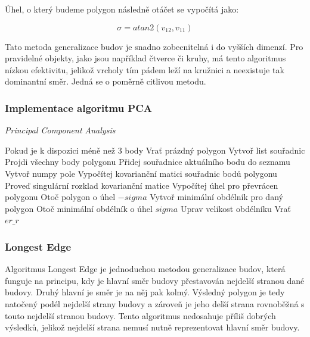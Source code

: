 \documentclass{article}
\begin{document}
\begin{spacing}{1.5}
Úhel, o který budeme polygon následně otáčet se vypočítá jako:

$$\sigma = atan2(v_{12},v_{11}) $$

Tato metoda generalizace budov je snadno zobecnitelná i do vyšších dimenzí. Pro pravidelné objekty, jako jsou například čtverce či kruhy, má tento algoritmus nízkou efektivitu, jelikož vrcholy tím pádem leží na kružnici a neexistuje tak dominantní směr. Jedná se o poměrně citlivou metodu. 

\newpage
\subsubsection*{Implementace algoritmu PCA}
\begin{algorithm}[h]
    \caption {\textit{Principal Component Analysis }}
    \begin{algorithmic}[1]
        \State Pokud je k dispozici méně než 3 body
        \State \indent Vrať prázdný polygon
        \State Vytvoř list souřadnic 
        \State Projdi všechny body polygonu
        \State \indent Přidej souřadnice aktuálního bodu do seznamu
        \State Vytvoř numpy pole
        \State Vypočítej kovarianční matici souřadnic bodů polygonu
        \State Proveď singulární rozklad kovarianční matice
        \State Vypočítej úhel pro převrácen polygonu
        \State Otoč polygon o úhel $-sigma$
        \State Vytvoř minimální obdélník pro daný polygon
        \State  Otoč minimální obdélník o úhel $sigma$
        \State Uprav velikost obdélníku 
        \State Vrať $er\_r$
    \end{algorithmic}
\end{algorithm}

\subsubsection{Longest Edge}
Algoritmus Longest Edge je jednoduchou metodou generalizace budov, která funguje na principu, kdy je hlavní směr budovy přestavován nejdelší stranou dané budovy. Druhý hlavní je směr je na něj pak kolmý. Výsledný polygon je tedy natočený podél nejdelší strany budovy a zároveň je jeho delší strana rovnoběžná s touto nejdelší stranou budovy. Tento algoritmus nedosahuje příliš dobrých výsledků, jelikož nejdelší strana nemusí nutně reprezentovat hlavní směr budovy.


\end{spacing}
\end{document}
